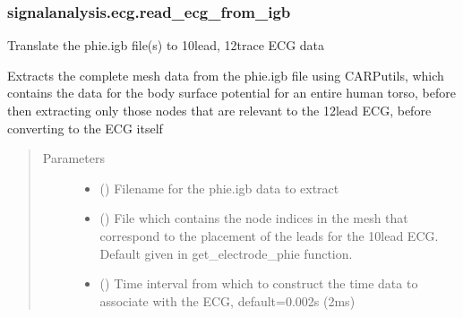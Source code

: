 \documentclass[letterpaper,10pt,english]{sphinxmanual}
\begin{document}
\subsubsection{signalanalysis.ecg.read\_ecg\_from\_igb}
\label{\detokenize{_autosummary/signalanalysis.ecg.read_ecg_from_igb:signalanalysis-ecg-read-ecg-from-igb}}\label{\detokenize{_autosummary/signalanalysis.ecg.read_ecg_from_igb::doc}}

\begin{fulllineitems}
\label{\detokenize{_autosummary/signalanalysis.ecg.read_ecg_from_igb:signalanalysis.ecg.read_ecg_from_igb}}
\sphinxAtStartPar
Translate the phie.igb file(s) to 10\sphinxhyphen{}lead, 12\sphinxhyphen{}trace ECG data

\sphinxAtStartPar
Extracts the complete mesh data from the phie.igb file using CARPutils, which contains the data for the body
surface potential for an entire human torso, before then extracting only those nodes that are relevant to the
12\sphinxhyphen{}lead ECG, before converting to the ECG itself
\begin{quote}\begin{description}
\item[{Parameters}] \leavevmode\begin{itemize}
\item {} 
\sphinxAtStartPar
{} () \textendash{} Filename for the phie.igb data to extract

\item {} 
\sphinxAtStartPar
{} () \textendash{} File which contains the node indices in the mesh that correspond to the placement of the leads for the
10\sphinxhyphen{}lead ECG. Default given in get\_electrode\_phie function.

\item {} 
\sphinxAtStartPar
{} () \textendash{} Time interval from which to construct the time data to associate with the ECG, default=0.002s (2ms)


\end{itemize}
\end{description}
\end{quote}
\end{fulllineitems}
\end{document}
